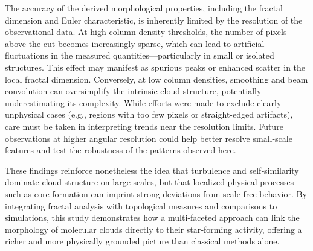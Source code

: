 The accuracy of the derived morphological properties, including the fractal dimension and Euler characteristic, is inherently limited by the resolution of the observational data. At high column density thresholds, the number of pixels above the cut becomes increasingly sparse, which can lead to artificial fluctuations in the measured quantities—particularly in small or isolated structures. This effect may manifest as spurious peaks or enhanced scatter in the local fractal dimension. Conversely, at low column densities, smoothing and beam convolution can oversimplify the intrinsic cloud structure, potentially underestimating its complexity. While efforts were made to exclude clearly unphysical cases (e.g., regions with too few pixels or straight-edged artifacts), care must be taken in interpreting trends near the resolution limits. 
Future observations at higher angular resolution could help better resolve small-scale features and test the robustness of the patterns observed here.

These findings reinforce nonetheless the idea that turbulence and self‑similarity dominate cloud structure on large scales, but that localized physical processes such as core formation can imprint strong deviations from scale‑free behavior.  
By integrating fractal analysis with topological measures and comparisons to simulations, this study demonstrates how a multi‑faceted approach can link the morphology of molecular clouds directly to their star‑forming activity, offering a richer and more physically grounded picture than classical methods alone.

